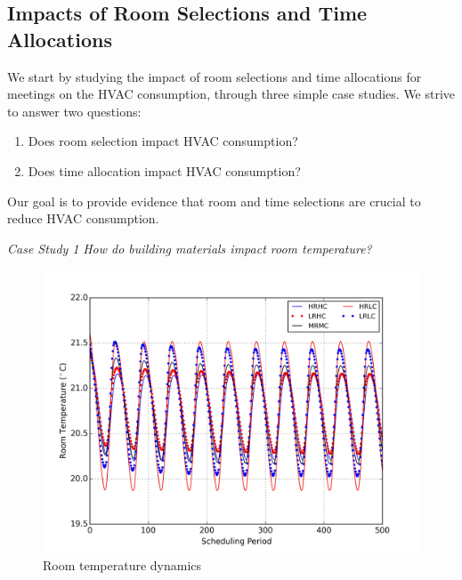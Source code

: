 \subsection{Impacts of Room Selections and Time Allocations}

We start by studying the impact of room selections and time allocations for meetings on the HVAC consumption, through three simple case studies. We strive to answer two questions:
\begin{enumerate}
	\item Does room selection impact HVAC consumption?
	\item Does time allocation impact HVAC consumption?
\end{enumerate}
\noindent Our goal is to provide evidence that room and time selections are crucial to reduce HVAC consumption.

\vspace{10px}
\emph{Case Study 1} \quad \textsl{How do building materials impact room temperature?}
\vspace{10px}

\begin{figure}
	\centering
		\includegraphics[width=0.74\linewidth,keepaspectratio]{./figs/mip_roomtemp.jpg}		
	\caption{Room temperature dynamics}
	\label{fig:mip_rt}
\end{figure}

